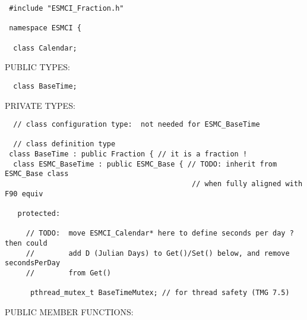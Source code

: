 \begin{verbatim} #include "ESMCI_Fraction.h"
 
 namespace ESMCI {
 
  class Calendar;
 \end{verbatim}{\sf PUBLIC TYPES:}
\begin{verbatim}  class BaseTime;
 \end{verbatim}{\sf PRIVATE TYPES:}
\begin{verbatim}  // class configuration type:  not needed for ESMC_BaseTime
 
  // class definition type
 class BaseTime : public Fraction { // it is a fraction !
  class ESMC_BaseTime : public ESMC_Base { // TODO: inherit from ESMC_Base class
                                            // when fully aligned with F90 equiv
 
   protected:
 
     // TODO:  move ESMCI_Calendar* here to define seconds per day ? then could
     //        add D (Julian Days) to Get()/Set() below, and remove secondsPerDay
     //        from Get()
 
      pthread_mutex_t BaseTimeMutex; // for thread safety (TMG 7.5)
 \end{verbatim}{\sf PUBLIC MEMBER FUNCTIONS:}
